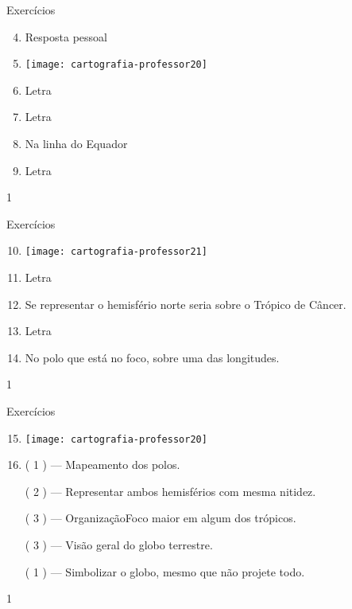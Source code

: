 \begin{answer}{Exercícios}
{
	\exerciselist
	\begin{enumerate}\setcounter{enumi}{3}
	\item Resposta pessoal
	\item
	{
	\texttt{[image: cartografia-professor20]}
	}

	\item Letra 

	\item Letra 

	\item Na linha do Equador

	\item  Letra 
	\end{enumerate}
}{1}
\end{answer}
\clearmargin
\begin{answer}{Exercícios}
{
	\exerciselist
	\begin{enumerate}\setcounter{enumi}{9}
	\item 
	{
	\texttt{[image: cartografia-professor21]}
	}

	\item Letra 

	\item Se representar o hemisfério norte seria sobre o Trópico de Câncer.

	\item Letra 

	\item No polo que está no foco, sobre uma das longitudes.

	\end{enumerate}
}{1}
\end{answer}
\clearmargin
\begin{answer}{Exercícios}
{
	\exerciselist
	\begin{enumerate}\setcounter{enumi}{14}
	\item 
	{
	\texttt{[image: cartografia-professor20]}
	}

	\vspace{3em}
 	\item 
	({ }{1}{ }) --- Mapeamento dos polos.

	({ }{2}{ }) --- Representar ambos hemisférios com mesma nitidez.

	({ }{3}{ }) --- OrganizaçãoFoco maior em algum dos trópicos.

	({ }{3}{ }) --- Visão geral do globo terrestre.

	({ }{1}{ }) --- Simbolizar o globo, mesmo que não projete todo.
	\end{enumerate}

}{1}
\end{answer}

